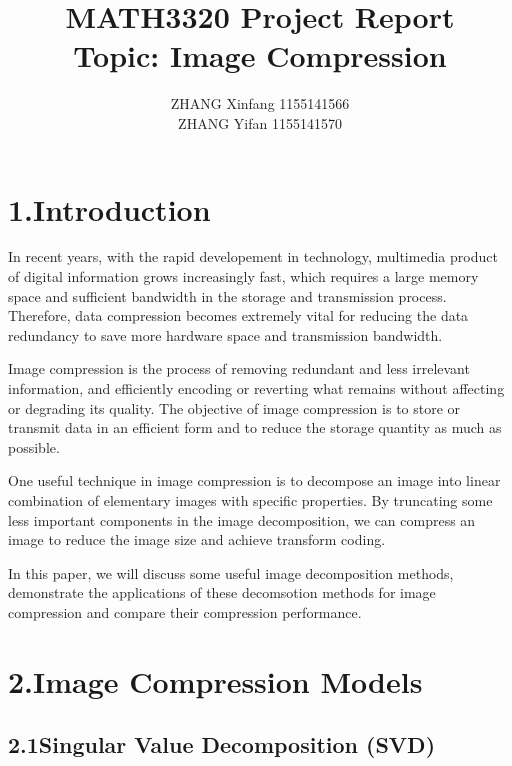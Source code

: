 \documentclass[12pt]{article}
\title{MATH3320 Project Report\\Topic: Image Compression}
\author{ZHANG Xinfang 1155141566\\ZHANG Yifan 1155141570}
\date{\displaydate{date}}
\begin{document}
   
\maketitle

\section*{1.\quad Introduction}
\begin{flushleft}
In recent years, with the rapid developement in technology, multimedia product 
of digital information grows increasingly fast, which requires a large memory space 
and sufficient bandwidth in the storage and transmission process. 
Therefore, data compression becomes extremely vital for reducing the data 
redundancy to save more hardware space and transmission bandwidth. 

Image compression is the process of removing redundant and less irrelevant information, 
and efficiently encoding or reverting what remains without affecting or degrading its quality. 
The objective of image compression is to store or transmit data in an efficient form
and to reduce the storage quantity as much as possible.

One useful technique in image compression is to decompose an image into linear combination 
of elementary images with specific properties. By truncating some less important components 
in the image decomposition, we can compress an image to reduce the image size 
and achieve transform coding. 

In this paper, we will discuss some useful image decomposition methods, demonstrate the 
applications of these decomsotion methods for image compression and compare their compression performance.
\end{flushleft}
\newpage

\section*{2.\quad Image Compression Models}
\subsection*{2.1\quad Singular Value Decomposition (SVD)}
\end{document}
